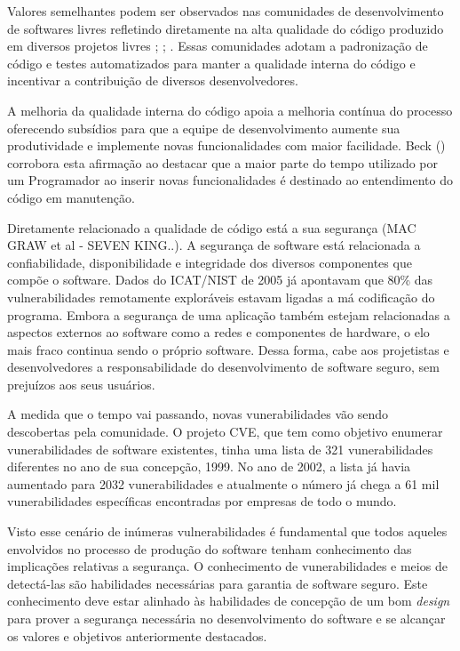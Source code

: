 %

Valores semelhantes podem ser observados nas comunidades de desenvolvimento de softwares livres refletindo diretamente na alta qualidade do código produzido em diversos projetos livres \cite{schmidt2001}; \cite{halloran2002}; \cite{michlmayr2003}. Essas comunidades adotam a padronização de código e testes automatizados para manter a qualidade interna do código e incentivar a contribuição de diversos desenvolvedores.

%

A melhoria da qualidade interna do código apoia a melhoria contínua do processo oferecendo subsídios para que a equipe de desenvolvimento aumente sua produtividade e implemente novas funcionalidades com maior facilidade. Beck (\citeyear{beck2007}) corrobora esta afirmação ao destacar que a maior parte do tempo utilizado por um Programador ao inserir novas funcionalidades é destinado ao entendimento do código em manutenção. 

%

Diretamente relacionado a qualidade de código está a sua segurança (MAC GRAW et al  - SEVEN KING..). A segurança de software está relacionada a confiabilidade, disponibilidade e integridade dos diversos componentes que compõe o software. Dados do ICAT/NIST de 2005 já apontavam que 80\% das vulnerabilidades remotamente exploráveis estavam ligadas a má codificação do programa. Embora a segurança de uma aplicação também estejam relacionadas a aspectos externos ao software como a redes e componentes de hardware, o elo mais fraco continua sendo o próprio software. Dessa forma, cabe aos projetistas e desenvolvedores a responsabilidade do desenvolvimento de software seguro, sem prejuízos aos seus usuários.

%

A medida que o tempo vai passando, novas vunerabilidades vão sendo descobertas pela comunidade. O projeto CVE, que tem como objetivo enumerar vunerabilidades de software existentes, tinha uma lista de 321 vunerabilidades diferentes no ano de sua concepção, 1999. No ano de 2002, a lista já havia aumentado para 2032 vunerabilidades e atualmente o número já chega a 61 mil vunerabilidades específicas encontradas por empresas de todo o mundo.

%

Visto esse cenário de inúmeras vulnerabilidades é fundamental que todos aqueles envolvidos no processo de produção do software tenham conhecimento das implicações relativas a segurança. O conhecimento de vunerabilidades e meios de detectá-las são habilidades necessárias para garantia de software seguro. Este conhecimento deve estar alinhado às habilidades de concepção de um bom \emph{design} para prover a segurança necessária no desenvolvimento do software e se alcançar os valores e objetivos anteriormente destacados.

